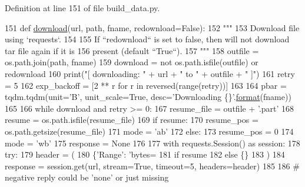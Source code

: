Definition at line 151 of file build\+\_\+data.\+py.


\begin{DoxyCode}
151 \textcolor{keyword}{def }\hyperlink{namespaceparlai_1_1core_1_1build__data_ab74f0e428f05e5d91fa93c8afb367622}{download}(url, path, fname, redownload=False):
152     \textcolor{stringliteral}{"""}
153 \textcolor{stringliteral}{    Download file using `requests`.}
154 \textcolor{stringliteral}{}
155 \textcolor{stringliteral}{    If ``redownload`` is set to false, then will not download tar file again if it is}
156 \textcolor{stringliteral}{    present (default ``True``).}
157 \textcolor{stringliteral}{    """}
158     outfile = os.path.join(path, fname)
159     download = \textcolor{keywordflow}{not} os.path.isfile(outfile) \textcolor{keywordflow}{or} redownload
160     print(\textcolor{stringliteral}{"[ downloading: "} + url + \textcolor{stringliteral}{" to "} + outfile + \textcolor{stringliteral}{" ]"})
161     retry = 5
162     exp\_backoff = [2 ** r \textcolor{keywordflow}{for} r \textcolor{keywordflow}{in} reversed(range(retry))]
163 
164     pbar = tqdm.tqdm(unit=\textcolor{stringliteral}{'B'}, unit\_scale=\textcolor{keyword}{True}, desc=\textcolor{stringliteral}{'Downloading \{\}'}.\hyperlink{namespaceparlai_1_1chat__service_1_1services_1_1messenger_1_1shared__utils_a32e2e2022b824fbaf80c747160b52a76}{format}(fname))
165 
166     \textcolor{keywordflow}{while} download \textcolor{keywordflow}{and} retry >= 0:
167         resume\_file = outfile + \textcolor{stringliteral}{'.part'}
168         resume = os.path.isfile(resume\_file)
169         \textcolor{keywordflow}{if} resume:
170             resume\_pos = os.path.getsize(resume\_file)
171             mode = \textcolor{stringliteral}{'ab'}
172         \textcolor{keywordflow}{else}:
173             resume\_pos = 0
174             mode = \textcolor{stringliteral}{'wb'}
175         response = \textcolor{keywordtype}{None}
176 
177         with requests.Session() \textcolor{keyword}{as} session:
178             \textcolor{keywordflow}{try}:
179                 header = (
180                     \{\textcolor{stringliteral}{'Range'}: \textcolor{stringliteral}{'bytes=%
181                     \textcolor{keywordflow}{if} resume
182                     \textcolor{keywordflow}{else} \{\}
183                 )
184                 response = session.get(url, stream=\textcolor{keyword}{True}, timeout=5, headers=header)
185 
186                 \textcolor{comment}{# negative reply could be 'none' or just missing}
}
\end{DoxyCode}
